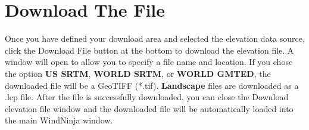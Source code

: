 \documentclass[12pt]{article}
\begin{document}
\section*{Download The File}
Once you have defined your download area and selected the elevation data source, click the Download File button at the bottom to download the elevation file.  A window will open to allow you to specify a file name and location.  %
If you chose the option \textbf{US SRTM}, \textbf{WORLD SRTM}, or \textbf{WORLD GMTED}, the downloaded file will be a GeoTIFF (*.tif). \textbf{Landscape} files are downloaded as a .lcp file.
After the file is successfully downloaded, you can close the Download elevation file window and the downloaded file will be automatically loaded into the main WindNinja window.
\end{document}
